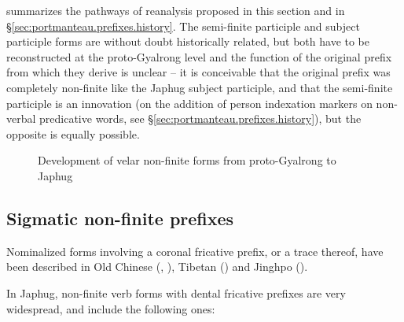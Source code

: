  summarizes the pathways of reanalysis proposed in this section and in §\ref{sec:portmanteau.prefixes.history}. The semi-finite participle and subject participle forms are without doubt historically related, but both have to be reconstructed at the proto-Gyalrong level and the function of the original prefix from which they derive is unclear -- it is conceivable that the original prefix was completely non-finite like the Japhug subject participle, and that the semi-finite participle is an innovation (on the addition of person indexation markers on non-verbal predicative words, see §\ref{sec:portmanteau.prefixes.history}), but the opposite is equally possible.

   \begin{figure}[H]
   \caption{Development of velar non-finite forms from proto-Gyalrong to Japhug} \label{fig:velar.nmlz.history}  
\end{figure}


\subsection{Sigmatic non-finite prefixes} \label{sec:sigmatic.nmlz.history}
Nominalized forms involving a coronal fricative prefix, or a trace thereof, have been described in Old Chinese (\citealt[73]{sagart99roc}, \citealt[56]{bs14oc}), Tibetan (\citealt{jacques18oc-nmlz}) and Jinghpo (\citealt[3--4]{dai92yufa}). 


In Japhug, non-finite verb forms with dental fricative prefixes are very widespread, and include the following ones:

